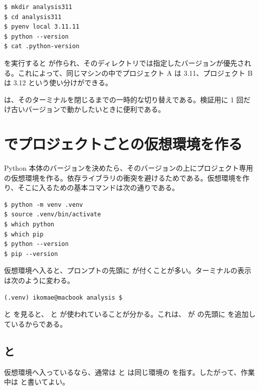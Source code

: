\begin{lstlisting}[numbers=none, xleftmargin=2\zw]
$ mkdir analysis311
$ cd analysis311
$ pyenv local 3.11.11
$ python --version
$ cat .python-version
\end{lstlisting}

 を実行すると  が作られ、そのディレクトリでは指定したバージョンが優先される。これによって、同じマシンの中でプロジェクト A は 3.11、プロジェクト B は 3.12 という使い分けができる。

 は、そのターミナルを閉じるまでの一時的な切り替えである。検証用に 1 回だけ古いバージョンで動かしたいときに便利である。

\section{ でプロジェクトごとの仮想環境を作る}

Python 本体のバージョンを決めたら、そのバージョンの上にプロジェクト専用の仮想環境を作る。依存ライブラリの衝突を避けるためである。仮想環境を作り、そこに入るための基本コマンドは次の通りである。

\begin{lstlisting}[numbers=none, xleftmargin=2\zw]
$ python -m venv .venv
$ source .venv/bin/activate
$ which python
$ which pip
$ python --version
$ pip --version
\end{lstlisting}

仮想環境へ入ると、プロンプトの先頭に  が付くことが多い。ターミナルの表示は次のように変わる。

\begin{lstlisting}[numbers=none, xleftmargin=2\zw]
(.venv) ikomae@macbook analysis $
\end{lstlisting}

 と  を見ると、 と  が使われていることが分かる。これは、 が  の先頭に  を追加しているからである。

\subsection{ と }

仮想環境へ入っているなら、通常は  と  は同じ環境の  を指す。したがって、作業中は  と書いてよい。

